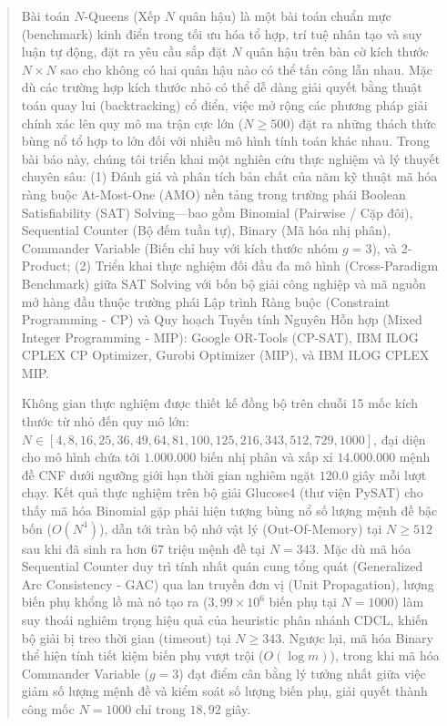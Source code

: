 \documentclass[a4paper,fleqn]{cas-sc}
\begin{document}
\begin{abstract}
Bài toán $N$-Queens (Xếp $N$ quân hậu) là một bài toán chuẩn mực (benchmark) kinh điển trong tối ưu hóa tổ hợp, trí tuệ nhân tạo và suy luận tự động, đặt ra yêu cầu sắp đặt $N$ quân hậu trên bàn cờ kích thước $N \times N$ sao cho không có hai quân hậu nào có thể tấn công lẫn nhau. Mặc dù các trường hợp kích thước nhỏ có thể dễ dàng giải quyết bằng thuật toán quay lui (backtracking) cổ điển, việc mở rộng các phương pháp giải chính xác lên quy mô ma trận cực lớn ($N \ge 500$) đặt ra những thách thức bùng nổ tổ hợp to lớn đối với nhiều mô hình tính toán khác nhau. Trong bài báo này, chúng tôi triển khai một nghiên cứu thực nghiệm và lý thuyết chuyên sâu: (1) Đánh giá và phân tích bản chất của năm kỹ thuật mã hóa ràng buộc At-Most-One (AMO) nền tảng trong trường phái Boolean Satisfiability (SAT) Solving---bao gồm Binomial (Pairwise / Cặp đôi), Sequential Counter (Bộ đếm tuần tự), Binary (Mã hóa nhị phân), Commander Variable (Biến chỉ huy với kích thước nhóm $g=3$), và 2-Product; (2) Triển khai thực nghiệm đối đầu đa mô hình (Cross-Paradigm Benchmark) giữa SAT Solving với bốn bộ giải công nghiệp và mã nguồn mở hàng đầu thuộc trường phái Lập trình Ràng buộc (Constraint Programming - CP) và Quy hoạch Tuyến tính Nguyên Hỗn hợp (Mixed Integer Programming - MIP): Google OR-Tools (CP-SAT), IBM ILOG CPLEX CP Optimizer, Gurobi Optimizer (MIP), và IBM ILOG CPLEX MIP.

Không gian thực nghiệm được thiết kế đồng bộ trên chuỗi 15 mốc kích thước từ nhỏ đến quy mô lớn: $N \in [4, 8, 16, 25, 36, 49, 64, 81, 100, 125, 216, 343, 512, 729, 1000]$, đại diện cho mô hình chứa tới $1.000.000$ biến nhị phân và xấp xỉ $14.000.000$ mệnh đề CNF dưới ngưỡng giới hạn thời gian nghiêm ngặt $120.0$ giây mỗi lượt chạy. Kết quả thực nghiệm trên bộ giải Glucose4 (thư viện PySAT) cho thấy mã hóa Binomial gặp phải hiện tượng bùng nổ số lượng mệnh đề bậc bốn ($O(N^4)$), dẫn tới tràn bộ nhớ vật lý (Out-Of-Memory) tại $N \ge 512$ sau khi đã sinh ra hơn $67$ triệu mệnh đề tại $N = 343$. Mặc dù mã hóa Sequential Counter duy trì tính nhất quán cung tổng quát (Generalized Arc Consistency - GAC) qua lan truyền đơn vị (Unit Propagation), lượng biến phụ khổng lồ mà nó tạo ra ($3{,}99 \times 10^6$ biến phụ tại $N = 1000$) làm suy thoái nghiêm trọng hiệu quả của heuristic phân nhánh CDCL, khiến bộ giải bị treo thời gian (timeout) tại $N \ge 343$. Ngược lại, mã hóa Binary thể hiện tính tiết kiệm biến phụ vượt trội ($O(\log m)$), trong khi mã hóa Commander Variable ($g=3$) đạt điểm cân bằng lý tưởng nhất giữa việc giảm số lượng mệnh đề và kiểm soát số lượng biến phụ, giải quyết thành công mốc $N = 1000$ chỉ trong $18{,}92$ giây. 


\end{abstract}
\end{document}
